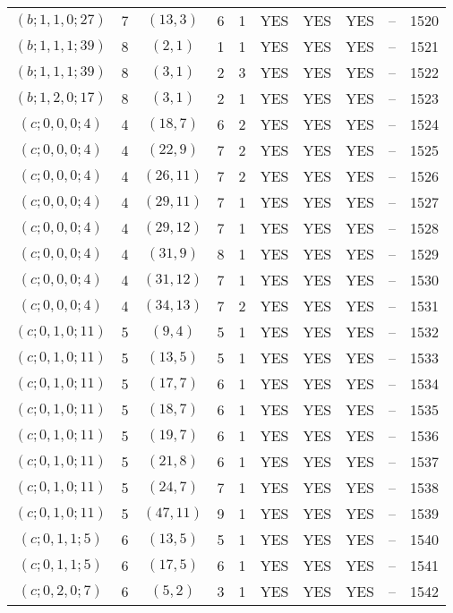 \begin{longtable}{|c|c|c|c|c|c|c|c|c|c|}
$(b; 1, 1, 0; 27)$ & 7 & $(13, 3)$ & 6 & 1 & YES & YES & YES & -- & 1520\\
$(b; 1, 1, 1; 39)$ & 8 & $(2, 1)$ & 1 & 1 & YES & YES & YES & -- & 1521\\
$(b; 1, 1, 1; 39)$ & 8 & $(3, 1)$ & 2 & 3 & YES & YES & YES & -- & 1522\\
$(b; 1, 2, 0; 17)$ & 8 & $(3, 1)$ & 2 & 1 & YES & YES & YES & -- & 1523\\
$(c; 0, 0, 0; 4)$ & 4 & $(18, 7)$ & 6 & 2 & YES & YES & YES & -- & 1524\\
$(c; 0, 0, 0; 4)$ & 4 & $(22, 9)$ & 7 & 2 & YES & YES & YES & -- & 1525\\
$(c; 0, 0, 0; 4)$ & 4 & $(26, 11)$ & 7 & 2 & YES & YES & YES & -- & 1526\\
$(c; 0, 0, 0; 4)$ & 4 & $(29, 11)$ & 7 & 1 & YES & YES & YES & -- & 1527\\
$(c; 0, 0, 0; 4)$ & 4 & $(29, 12)$ & 7 & 1 & YES & YES & YES & -- & 1528\\
$(c; 0, 0, 0; 4)$ & 4 & $(31, 9)$ & 8 & 1 & YES & YES & YES & -- & 1529\\
$(c; 0, 0, 0; 4)$ & 4 & $(31, 12)$ & 7 & 1 & YES & YES & YES & -- & 1530\\
$(c; 0, 0, 0; 4)$ & 4 & $(34, 13)$ & 7 & 2 & YES & YES & YES & -- & 1531\\
$(c; 0, 1, 0; 11)$ & 5 & $(9, 4)$ & 5 & 1 & YES & YES & YES & -- & 1532\\
$(c; 0, 1, 0; 11)$ & 5 & $(13, 5)$ & 5 & 1 & YES & YES & YES & -- & 1533\\
$(c; 0, 1, 0; 11)$ & 5 & $(17, 7)$ & 6 & 1 & YES & YES & YES & -- & 1534\\
$(c; 0, 1, 0; 11)$ & 5 & $(18, 7)$ & 6 & 1 & YES & YES & YES & -- & 1535\\
$(c; 0, 1, 0; 11)$ & 5 & $(19, 7)$ & 6 & 1 & YES & YES & YES & -- & 1536\\
$(c; 0, 1, 0; 11)$ & 5 & $(21, 8)$ & 6 & 1 & YES & YES & YES & -- & 1537\\
$(c; 0, 1, 0; 11)$ & 5 & $(24, 7)$ & 7 & 1 & YES & YES & YES & -- & 1538\\
$(c; 0, 1, 0; 11)$ & 5 & $(47, 11)$ & 9 & 1 & YES & YES & YES & -- & 1539\\
$(c; 0, 1, 1; 5)$ & 6 & $(13, 5)$ & 5 & 1 & YES & YES & YES & -- & 1540\\
$(c; 0, 1, 1; 5)$ & 6 & $(17, 5)$ & 6 & 1 & YES & YES & YES & -- & 1541\\
$(c; 0, 2, 0; 7)$ & 6 & $(5, 2)$ & 3 & 1 & YES & YES & YES & -- & 1542\\

\end{longtable}
